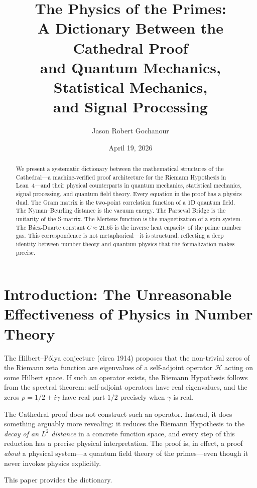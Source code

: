 \documentclass[11pt,a4paper]{article}
\title{%
  The Physics of the Primes:\\
  A Dictionary Between the Cathedral Proof\\
  and Quantum Mechanics, Statistical Mechanics,\\
  and Signal Processing%
}
\author{
  Jason Robert Gochanour
}
\date{April 19, 2026}
\theoremstyle{definition}
\newcommand{\HH}{\mathcal{H}}
\begin{document}
\maketitle

\begin{abstract}
We present a systematic dictionary between the mathematical structures
of the Cathedral---a machine-verified proof architecture for the
Riemann Hypothesis in Lean~4---and their physical counterparts in
quantum mechanics, statistical mechanics, signal processing, and
quantum field theory. Every equation in the proof has a physics dual.
The Gram matrix is the two-point correlation function of a 1D quantum
field. The Nyman--Beurling distance is the vacuum energy. The Parseval
Bridge is the unitarity of the S-matrix. The Mertens function is the
magnetization of a spin system. The B\'aez-Duarte constant
$C \approx 21.65$ is the inverse heat capacity of the prime number gas.
This correspondence is not metaphorical---it is structural, reflecting
a deep identity between number theory and quantum physics that the
formalization makes precise.
\end{abstract}

\section{Introduction: The Unreasonable Effectiveness of Physics in Number Theory}

The Hilbert--P\'olya conjecture (circa 1914) proposes that the non-trivial
zeros of the Riemann zeta function are eigenvalues of a self-adjoint operator
$\HH$ acting on some Hilbert space. If such an operator exists, the Riemann
Hypothesis follows from the spectral theorem: self-adjoint operators have
real eigenvalues, and the zeros $\rho = 1/2 + i\gamma$ have real part $1/2$
precisely when $\gamma$ is real.

The Cathedral proof does not construct such an operator. Instead, it does
something arguably more revealing: it reduces the Riemann Hypothesis to
the \emph{decay of an $L^2$ distance} in a concrete function space, and
every step of this reduction has a precise physical interpretation. The proof
is, in effect, a proof \emph{about} a physical system---a quantum field
theory of the primes---even though it never invokes physics explicitly.

This paper provides the dictionary.
\end{document}
